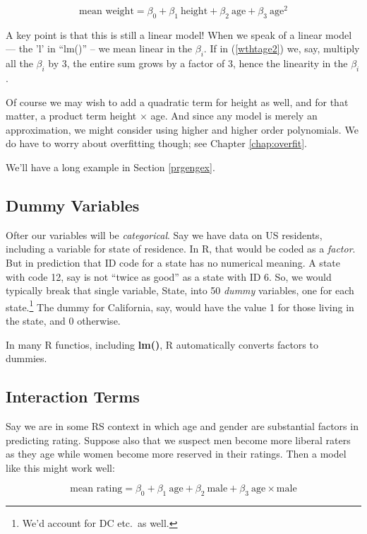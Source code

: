 \begin{equation}
\label{wthtage2}
\textrm{mean weight} = \beta_0 + \beta_1 ~ \textrm{height} + 
\beta_2 ~ \textrm{age} +
\beta_3 ~ \textrm{age}^2
\end{equation}

A key point is that this is still a linear model! When we speak of a
linear model --- the 'l' in ``lm()'' -- we mean linear in the $\beta_i$.
If in (\ref{wthtage2}) we, say, multiply all the $\beta_i$ by 3, the
entire sum grows by a factor of 3, hence the linearity in the $\beta_i$.

Of course we may wish to add a quadratic term for height as well, and
for that matter, a product term height $\times$ age.  And since any
model is merely an approximation, we might consider using higher and
higher order polynomials.  We do have to worry about overfitting though;
see Chapter \ref{chap:overfit}.

We'll have a long example in Section \ref{prgengex}.

\subsection{Dummy Variables}

Ofter our variables will be \textit{categorical}.  Say we have data on
US residents, including a variable for state of residence.  In R, that
would be coded as a \textit{factor}.  But in prediction that ID code for
a state has no numerical meaning.  A state with code 12, say is not
``twice as good'' as a state with ID 6.  So, we would typically break that
single variable, State, into 50 \textit{dummy} variables, one for each
state.\footnote{We'd account for DC etc.\ as well.}  The dummy for
California, say, would have the value 1 for those living in the state,
and 0 otherwise.

In many R functios, including \textbf{lm()}, R automatically converts
factors to dummies.

\subsection{Interaction Terms}

Say we are in some RS context in which age and gender are substantial
factors in predicting rating.  Suppose also that we suspect men become
more liberal raters as they age while women become more reserved in
their ratings.  Then a model like this might work well:

\begin{equation}
\label{mfinteraction}
\textrm{mean rating} = \beta_0 + \beta_1 ~ \textrm{age} + 
\beta_2 ~ \textrm{male} +
\beta_3 ~ \textrm{age} \times \textrm{male}
\end{equation}

